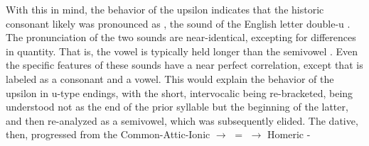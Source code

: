 

With this in mind, the behavior of the upsilon  indicates
that the historic consonant likely was pronounced as ,
the sound of the English letter double-u . 
The pronunciation of the two sounds are near-identical, excepting
for differences in quantity. That is, the vowel  is typically
held longer than the semivowel . Even the specific features
of these sounds have a near perfect correlation,
except that  is labeled as a consonant and  a vowel.
This would explain the behavior of the upsilon  in u-type
endings, with the short, intervocalic  being re-bracketed, being
understood not as the end of the prior syllable but the beginning of the
latter, and then re-analyzed as a semivowel, which was subsequently elided.
The dative, then, progressed from the Common-Attic-Ionic
 $\to$
 $=$
 $\to$ Homeric
-

